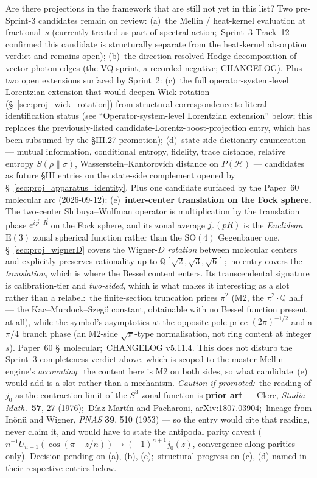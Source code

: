 \documentclass[11pt]{article}
\begin{document}
\begin{enumerate}
Are there projections in the framework that are still not yet in
this list?  Two pre-Sprint-3 candidates remain on review:
(a)~the Mellin / heat-kernel evaluation at fractional~$s$
(currently treated as part of spectral-action;\ Sprint~3 Track~12
confirmed this candidate is structurally separate from the heat-kernel
absorption verdict and remains open);
(b)~the direction-resolved Hodge decomposition of vector-photon
edges (the VQ sprint, a recorded negative; CHANGELOG).
Plus two open extensions surfaced by Sprint~2:
(c)~the full operator-system-level Lorentzian extension that would
deepen Wick rotation (\S~\ref{sec:proj_wick_rotation}) from
structural-correspondence to literal-identification status (see
``Operator-system-level Lorentzian extension'' below; this replaces
the previously-listed candidate-Lorentz-boost-projection entry, which
has been subsumed by the §III.27 promotion);
(d)~state-side dictionary enumeration --- mutual information,
conditional entropy, fidelity, trace distance, relative entropy
$S(\rho\|\sigma)$, Wasserstein--Kantorovich distance on $P(\mathcal{H})$
--- candidates as future §III entries on the state-side complement
opened by \S~\ref{sec:proj_apparatus_identity}.
Plus one candidate surfaced by the Paper~60 molecular arc (2026-09-12):
(e)~\textbf{inter-center translation on the Fock sphere.}  The two-center
Shibuya--Wulfman operator is multiplication by the translation phase
$e^{i\vec{p}\cdot\vec{R}}$ on the Fock sphere, and its zonal average
$j_0(pR)$ is the \emph{Euclidean} $\mathrm{E}(3)$ zonal spherical function
rather than the $\mathrm{SO}(4)$ Gegenbauer one.  \S~\ref{sec:proj_wignerD}
covers the Wigner-$D$ \emph{rotation} between molecular centers and
explicitly preserves rationality up to
$\mathbb{Q}[\sqrt2,\sqrt3,\sqrt6]$;\ no entry covers the
\emph{translation}, which is where the Bessel content enters.  Its
transcendental signature is calibration-tier and \emph{two-sided}, which is
what makes it interesting as a slot rather than a relabel:\ the
finite-section truncation prices $\pi^2$ (M2, the $\pi^2\cdot\mathbb{Q}$
half --- the Kac--Murdock--Szeg\H{o} constant, obtainable with no Bessel
function present at all), while the symbol's asymptotics at the opposite
pole price $(2\pi)^{-1/2}$ and a $\pi/4$ branch phase (an M2-side
$\sqrt{\pi}$-type normalisation, not ring content at integer $s$).  Paper~60 \S~molecular;\ CHANGELOG
v5.11.4.  This does not disturb the Sprint~3 completeness verdict above,
which is scoped to the master Mellin engine's \emph{accounting}:\ the
content here is M2 on both sides, so what candidate~(e) would add is a
slot rather than a mechanism.  \emph{Caution if promoted:}\ the reading of $j_0$ as the
contraction limit of the $S^3$ zonal function is \textbf{prior art} ---
Clerc, \textit{Studia Math.}\ \textbf{57}, 27 (1976);\ D\'iaz Mart\'in and
Pacharoni, arXiv:1807.03904;\ lineage from In\"on\"u and Wigner,
\textit{PNAS} \textbf{39}, 510 (1953) --- so the entry would cite that
reading, never claim it, and would have to state the antipodal parity
caveat ($n^{-1}U_{n-1}(\cos(\pi-z/n))\to(-1)^{n+1}j_0(z)$, convergence
along parities only).
Decision pending on (a), (b), (e);\ structural progress on (c), (d) named
in their respective entries below.


\end{enumerate}
\end{document}
